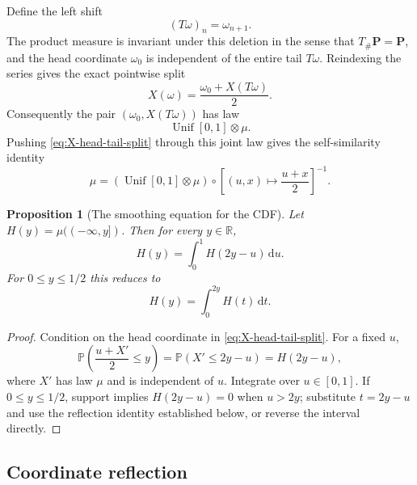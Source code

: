 \documentclass[11pt,oneside]{article}
\newtheorem{proposition}[theorem]{Proposition}
\theoremstyle{definition}
\theoremstyle{remark}
\newcommand{\R}{\mathbb R}
\newcommand{\dd}{\,\mathrm d}
\newcommand{\Prob}{\mathbb P}
\begin{document}
Define the left shift
\begin{equation}
 (T\omega)_n=\omega_{n+1}.
 \label{eq:tail-map}
\end{equation}
The product measure is invariant under this deletion in the sense that $T_\#\mathbf P=\mathbf
P$, and the head coordinate $\omega_0$ is independent of the entire tail $T\omega$.  Reindexing
the series gives the exact pointwise split
\begin{equation}
 X(\omega)=\frac{\omega_0+X(T\omega)}2.
 \label{eq:X-head-tail-split}
\end{equation}
Consequently the pair $(\omega_0,X(T\omega))$ has law
\begin{equation}
 \operatorname{Unif}[0,1]\otimes\mu.
 \label{eq:head-tail-law}
\end{equation}
Pushing \eqref{eq:X-head-tail-split} through this joint law gives the self-similarity identity
\begin{equation}
 \mu=\left(\operatorname{Unif}[0,1]\otimes\mu\right)
       \circ\left[(u,x)\mapsto\frac{u+x}{2}\right]^{-1}.
 \label{eq:law-self-similarity}
\end{equation}

\begin{proposition}[The smoothing equation for the CDF]
\label{prop:CDF-smoothing-detailed}
Let $H(y)=\mu(({-\infty},y])$.  Then for every $y\in\R$,
\begin{equation}
 H(y)=\int_0^1 H(2y-u)\dd u.
 \label{eq:CDF-smoothing-detailed}
\end{equation}
For $0\le y\le1/2$ this reduces to
\begin{equation}
 H(y)=\int_0^{2y}H(t)\dd t.
 \label{eq:CDF-left-detailed}
\end{equation}
\end{proposition}

\begin{proof}
Condition on the head coordinate in \eqref{eq:X-head-tail-split}.  For a fixed $u$,
\[
 \Prob\!\left(\frac{u+X'}2\le y\right)=\Prob(X'\le2y-u)=H(2y-u),
\]
where $X'$ has law $\mu$ and is independent of $u$.  Integrate over $u\in[0,1]$.  If
$0\le y\le1/2$, support implies $H(2y-u)=0$ when $u>2y$; substitute $t=2y-u$ and use the
reflection identity established below, or reverse the interval directly.
\end{proof}

\subsection{Coordinate reflection}
\end{document}
